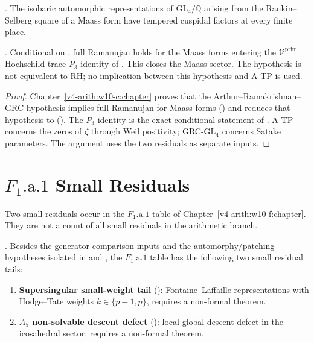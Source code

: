\begin{hypothesis}
\label{v4-arith:w10-final:hyp:GRC-GL4}
\ClaimStatusConditional. The isobaric automorphic representations of
\(\mathrm{GL}_{4}/\mathbb{Q}\) arising from the Rankin--Selberg square
of a Maass form have tempered cuspidal factors at every finite place.
\end{hypothesis}

\begin{proposition}
\label{v4-arith:w10-final:prop:GRC-GL4}
\ClaimStatusProvedHereConditional. Conditional on
, full Ramanujan holds for the
Maass forms entering the \(\mathcal{V}^{\mathrm{prim}}\)
Hochschild-trace \(P_{3}\) identity of .
This closes the Maass sector. The hypothesis is not equivalent to RH;
no implication between this hypothesis and A-TP is used.
\end{proposition}

\begin{proof}
Chapter~\ref{v4-arith:w10-c:chapter} proves that the
Arthur--Ramakrishnan--GRC hypothesis implies full Ramanujan for Maass forms
() and reduces that
hypothesis to 
(). The \(P_{3}\) identity
is the exact conditional statement of .
A-TP concerns the zeros of \(\zeta\) through Weil positivity;
GRC-\(\mathrm{GL}_{4}\) concerns Satake parameters.  The argument uses
the two residuals as separate inputs.
\end{proof}

\section{\(F_{1}\text{.a.1}\) Small Residuals}
\label{v4-arith:w10-final:tier3}

Two small residuals occur in the \(F_{1}\text{.a.1}\) table of
Chapter~\ref{v4-arith:w10-f:chapter}. They are not a count of all
small residuals in the arithmetic branch.

\begin{proposition}
\label{v4-arith:w10-final:prop:small-residuals}
\ClaimStatusProvedHere. Besides the generator-comparison inputs and the
automorphy/patching hypotheses isolated in
 and
,
the \(F_{1}\text{.a.1}\) table has the following two small residual tails:
\begin{enumerate}
\item \textbf{Supersingular small-weight tail}
(): Fontaine--Laffaille
representations with Hodge--Tate weights
\(k \in \{p-1, p\}\), requires a non-formal theorem.
\item \textbf{\(A_{5}\) non-solvable descent defect}
(): local-global descent defect
in the icosahedral sector, requires a non-formal theorem.
\end{enumerate}
\end{proposition}

